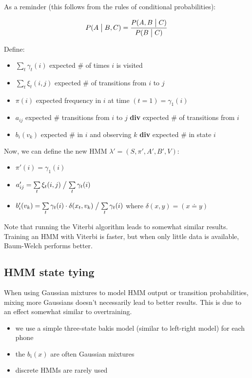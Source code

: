 \documentclass[11pt]{article}
\begin{document}
As a reminder (this follows from the rules of conditional probabilities):

\begin{equation}
    P(A \bigm| B, C) = \frac{P(A, B \bigm| C)}{P(B \bigm| C)}
\end{equation}

Define:
\begin{itemize}
    \item $\sum\limits_t \gamma_t(i)$ expected \# of times $i$ is visited
    \item $\sum\limits_t \xi_t(i, j)$ expected \# of transitions from $i$ to $j$
    \item $\pi(i)$ expected frequency in $i$ at time $(t = 1) = \gamma_1(i)$
    \item $a_{ij}$ expected \# transitions from $i$ to $j$ \textbf{div} expected \# of transitions from $i$
    \item $b_i(v_k)$ expected \# in $i$ and observing $k$ \textbf{div} expected \# in state $i$
\end{itemize}

Now, we can define the new HMM $\lambda' = (S, \pi', A', B', V)$:
\begin{itemize}
    \item $\pi'(i) = \gamma_1(i)$
    \item $a'_{ij} = \sum\limits_t \xi_t(i, j) \bigm/ \sum\limits_t \gamma_t(i)$
    \item $b'_i(v_k) = \sum\limits_t \gamma_t(i) \cdot \delta(x_t, v_k) \bigm/ \sum\limits_t \gamma_t(i)$ where $\delta(x, y) = (x \doteq y)$
\end{itemize}

Note that running the Viterbi algorithm leads to somewhat similar results. Training an HMM with Viterbi is faster, but when only little data is available, Baum-Welch performs better.

\subsection{HMM state tying}

When using Gaussian mixtures to model HMM output or transition probabilities, mixing more Gaussians doesn't necessarily lead to better results. This is due to an effect somewhat similar to overtraining.

\begin{itemize}
    \item we use a simple three-state bakis model (similar to left-right model) for each phone
    \item the $b_i(x)$ are often Gaussian mixtures
    \item discrete HMMs are rarely used
\end{itemize}
\end{document}
